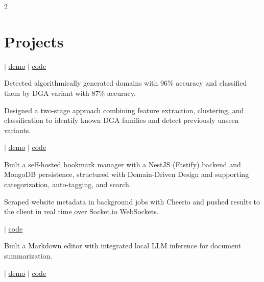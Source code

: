 \documentclass[]{hieudo-build}
\begin{document}
\begin{paracol}{2}
\section{Projects}

 $|$ \href{https://dga-detector.streamlit.app}{demo} $|$ \href{https://github.com/Vikramadtya/DGA-Detector}{code}

\begin{tightemize}
\item Detected algorithmically generated domains with 96\% accuracy and classified them by DGA variant with 87\% accuracy.
\item Designed a two-stage approach combining feature extraction, clustering, and classification to identify known DGA families and detect previously unseen variants.
\end{tightemize}
\sectionsep

 $|$ \href{https://bookmarker-theta-three.vercel.app}{demo} $|$ \href{https://github.com/Vikramadtya/Bookmarker}{code}

\begin{tightemize}
\item Built a self-hosted bookmark manager with a NestJS (Fastify) backend and MongoDB persistence, structured with Domain-Driven Design and supporting categorization, auto-tagging, and search.
\item Scraped website metadata in background jobs with Cheerio and pushed results to the client in real time over Socket.io WebSockets.
\end{tightemize}
\sectionsep 

 $|$ \href{https://github.com/Vikramadtya/Meditor}{code}

\begin{tightemize}
\item Built a Markdown editor with integrated local LLM inference for document summarization.
\end{tightemize}
\sectionsep 

 $|$ \href{https://expensesplit-mauve.vercel.app/login}{demo} $|$ \href{https://github.com/Vikramadtya/ExpenseSplit}{code}


\end{paracol}
\end{document}
